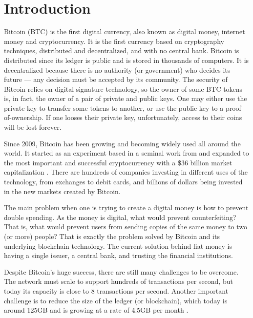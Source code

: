 
\chapter{Introduction}

Bitcoin (BTC) is the first digital currency, also known as digital money, internet money and cryptocurrency. It is the first currency based on cryptography techniques, distributed and decentralized, and with no central bank. Bitcoin is distributed since its ledger is public and is stored in thousands of computers. It is decentralized because there is no authority (or government) who decides its future --- any decision must be accepted by its community. The security of Bitcoin relies on digital signature technology, so the owner of some BTC tokens is, in fact, the owner of a pair of private and public keys. One may either use the private key to transfer some tokens to another, or use the public key to a proof-of-ownership. If one looses their private key, unfortunately, access to their coins will be lost forever.

Since 2009, Bitcoin has been growing and becoming widely used all around the world. It started as an experiment based in a seminal work from \citet{nakamoto2008bitcoin} and expanded to the most important and successful cryptocurrency with a \$36 billion market capitalization \citep{coinmarketcapbtc}. There are hundreds of companies investing in different uses of the technology, from exchanges to debit cards, and billions of dollars being invested in the new markets created by Bitcoin.

The main problem when one is trying to create a digital money is how to prevent double spending. As the money is digital, what would prevent counterfeiting? That is, what would prevent users from sending copies of the same money to two (or more) people? That is exactly the problem solved by Bitcoin and its underlying blockchain technology. The current solution behind fiat money is having a single issuer, a central bank, and trusting the financial institutions.

Despite Bitcoin's huge success, there are still many challenges to be overcome. The network must scale to support hundreds of transactions per second, but today its capacity is close to 8 transactions per second. Another important challenge is to reduce the size of the ledger (or blockchain), which today is around 125GB and is growing at a rate of 4.5GB per month \citep{blockchaininfosize}.

